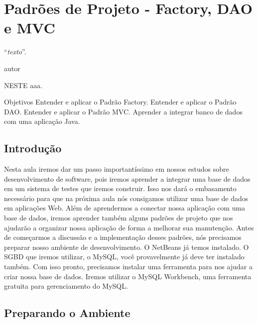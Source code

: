 \chapter{Padrões de Projeto - Factory, DAO e MVC}
\epigraph{``\textit{texto}''.}{autor}

\lettrine[lines=4, lhang=0.1, lraise=0, loversize=0.2, findent=0.1em]{\textcolor{corAzulTema}{N}}{ESTE} aaa.

Objetivos
Entender e aplicar o Padrão Factory.
Entender e aplicar o Padrão DAO.
Entender e aplicar o Padrão MVC.
Aprender a integrar banco de dados com uma aplicação Java.


\section{Introdução}

Nesta aula iremos dar um passo importantíssimo em nossos estudos sobre desenvolvimento de software, pois iremos aprender a integrar uma base de dados em um sistema de testes que iremos construir. Isso nos dará o embasamento necessário para que na próxima aula nós consigamos utilizar uma base de dados em aplicações Web. Além de aprendermos a conectar nossa aplicação com uma base de dados, iremos aprender também alguns padrões de projeto que nos ajudarão a organizar nossa aplicação de forma a melhorar sua manutenção. 
Antes de começarmos a discussão e a implementação desses padrões, nós precisamos preparar nosso ambiente de desenvolvimento. O NetBeans já temos instalado. O SGBD que iremos utilizar, o MySQL, você provavelmente já deve ter instalado também. Com isso pronto, precisamos instalar uma ferramenta para nos ajudar a criar nossa base de dados. Iremos utilizar o MySQL Workbench, uma ferramenta gratuita para gerenciamento do MySQL. 


\section{Preparando o Ambiente}

